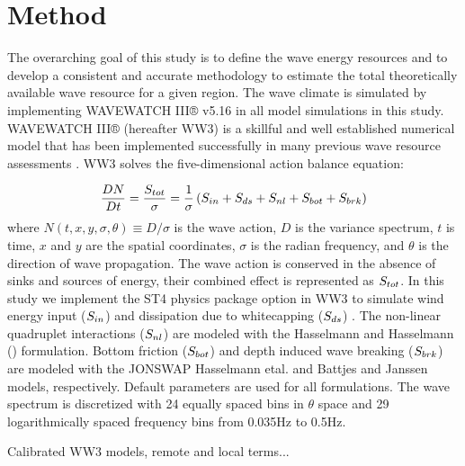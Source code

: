 \section{Method}

The overarching goal of this study is to define the wave energy resources and to
develop a consistent and accurate methodology to estimate the total
theoretically available wave resource for a given region. The wave climate is
simulated by implementing WAVEWATCH III® v5.16
\citep{tolmanDistributedmemoryConceptsWave2002} in all model
simulations in this study. WAVEWATCH III® (hereafter WW3) is a skillful and well
established numerical model that has been implemented successfully in many
previous wave resource assessments
\citep[e.g.,][]{garcia-medinaWaveResourceAssessment2014,yangWaveModelTest2017}.
WW3 solves the five-dimensional action balance equation:

\begin{align}
    \frac{DN}{Dt} = \frac{S_{ tot }}{\sigma} = \frac{1}{\sigma}\left ( S_{ in } + S_{ ds } + S_{ nl } + S_{ bot } + S_{ brk } \right )
\end{align}
where $N(t,x,y,\sigma,\theta) \equiv D/\sigma$ is the wave action, $D$ is the variance spectrum, $t$ is
time, $x$ and $y$ are the spatial coordinates, $\sigma$ is the radian frequency, and $\theta$ is
the direction of wave propagation. The wave action is conserved in the absence
of sinks and sources of energy, their combined effect is represented as $S_{ tot }$. In
this study we implement the ST4 physics package option in WW3 to simulate wind
energy input ($S_{ in }$) and dissipation due to whitecapping ($S_{ ds }$)
\citep{ardhuinObservationSwellDissipation2009}. The non-linear quadruplet
interactions ($S_{ nl }$) are modeled with the
Hasselmann and Hasselmann
(\citeyear{hasselmannComputationsParameterizationsNonlinear1985}) formulation.
Bottom friction ($S_{ bot }$) and depth induced wave breaking ($S_{ brk }$) are
modeled with the JONSWAP Hasselmann etal.
\citeyear{hasselmannMeasurementsWindwaveGrowth1973} and Battjes
and Janssen \citeyear{battjesEnergyLossSetup1978} models, respectively.
Default parameters are used for all formulations. The wave spectrum is
discretized with 24 equally spaced bins in $\theta$ space and 29 logarithmically spaced
frequency bins from 0.035Hz to 0.5Hz. 


Calibrated WW3 models, remote and local terms...

